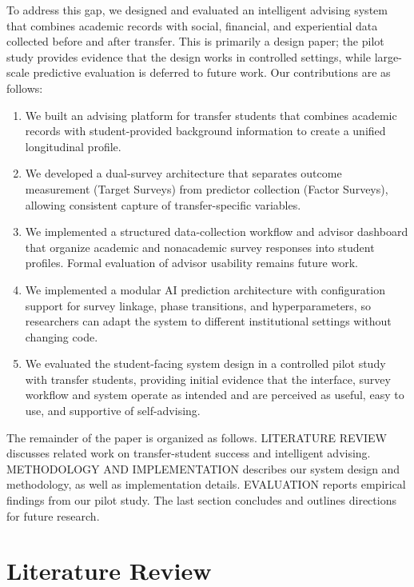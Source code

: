 \documentclass[letterpaper,11pt]{article}
\begin{document}
To address this gap, we designed and evaluated an intelligent advising system that combines academic records with social, financial, and experiential data collected before and after transfer. This is primarily a design paper; the pilot study provides evidence that the design works in controlled settings, while large-scale predictive evaluation is deferred to future work. Our contributions are as follows:

\begin{enumerate}
    \item We built an advising platform for transfer students that combines academic records with student-provided background information to create a unified longitudinal profile.
    \item We developed a dual-survey architecture that separates outcome measurement (Target Surveys) from predictor collection (Factor Surveys), allowing consistent capture of transfer-specific variables.
    \item We implemented a structured data-collection workflow and advisor dashboard that organize academic and nonacademic survey responses into student profiles. Formal evaluation of advisor usability remains future work.
    \item We implemented a modular AI prediction architecture with configuration support for survey linkage, phase transitions, and hyperparameters, so researchers can adapt the system to different institutional settings without changing code.
    \item We evaluated the student-facing system design in a controlled pilot study with transfer students, providing initial evidence that the interface, survey workflow and system operate as intended and are perceived as useful, easy to use, and supportive of self-advising.
\end{enumerate}

The remainder of the paper is organized as follows. LITERATURE REVIEW discusses related work on transfer-student success and intelligent advising. METHODOLOGY AND IMPLEMENTATION describes our system design and methodology, as well as implementation details. EVALUATION reports empirical findings from our pilot study. The last section concludes and outlines directions for future research.

\section{Literature Review}\label{sec:literature}
\end{document}
